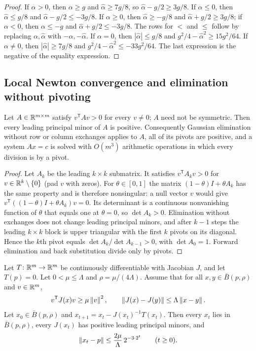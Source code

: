 \begin{proof}
If $\alpha>0$, then $\alpha\ge g$ and $\hat\alpha\ge7g/8$, so
$\hat\alpha-g/2\ge3g/8$. If $\alpha\le0$, then $\hat\alpha\le g/8$ and
$\hat\alpha-g/2\le-3g/8$. If $\alpha\ge0$, then $\hat\alpha\ge-g/8$ and
$\hat\alpha+g/2\ge3g/8$; if $\alpha<0$, then $\alpha\le-g$ and
$\hat\alpha+g/2\le-3g/8$. The rows for $<$ and $\le$ follow by replacing
$\alpha,\hat\alpha$ with $-\alpha,-\hat\alpha$. If $\alpha=0$, then
$|\hat\alpha|\le g/8$ and $g^2/4-\hat\alpha^2\ge15g^2/64$. If $\alpha\ne0$,
then $|\hat\alpha|\ge7g/8$ and $g^2/4-\hat\alpha^2\le-33g^2/64$. The last
expression is the negative of the equality expression.
\end{proof}

\subsection{Local Newton convergence and elimination without pivoting}
\label{app:upper-newton}

\begin{lemma}
\label{lem:upper-pivots}
Let $A\in\mathbb R^{m\times m}$ satisfy $v^{\mathsf T}Av>0$ for every $v\ne0$; $A$
need not be symmetric. Then every leading principal minor of $A$ is
positive. Consequently Gaussian elimination without row or column exchanges
applies to $A$, all of its pivots are positive, and a system $Ax=c$ is solved
with $O(m^3)$ arithmetic operations in which every division is by a pivot.
\end{lemma}

\begin{proof}
Let $A_k$ be the leading $k\times k$ submatrix. It satisfies
$v^{\mathsf T}A_kv>0$ for $v\in\mathbb R^k\setminus\{0\}$ (pad $v$ with zeros). For
$\theta\in[0,1]$ the matrix $(1-\theta)I+\theta A_k$ has the same property and
is therefore nonsingular: a null vector $v$ would give
$v^{\mathsf T}((1-\theta)I+\theta A_k)v=0$. Its determinant is a continuous
nonvanishing function of $\theta$ that equals one at $\theta=0$, so
$\det A_k>0$. Elimination without exchanges does not change leading principal
minors, and after $k-1$ steps the leading $k\times k$ block is upper triangular
with the first $k$ pivots on its diagonal. Hence the $k$th pivot equals
$\det A_k/\det A_{k-1}>0$, with $\det A_0=1$. Forward elimination and back
substitution divide only by pivots.
\end{proof}

\begin{lemma}
\label{lem:upper-local-newton}
Let $T\colon\mathbb R^m\to\mathbb R^m$ be continuously differentiable with Jacobian $J$,
and let $T(p)=0$. Let $0<\mu\le\Lambda$ and $\rho=\mu/(4\Lambda)$. Assume that
for all $x,y\in\bar B(p,\rho)$ and $v\in\mathbb R^m$,
\[
 v^{\mathsf T}J(x)v\ge\mu\left\lVert v\right\rVert^2,\qquad
 \left\lVert J(x)-J(y)\right\rVert\le\Lambda\left\lVert x-y\right\rVert.
\]
Let $x_0\in\bar B(p,\rho)$ and $x_{t+1}=x_t-J(x_t)^{-1}T(x_t)$. Then every
$x_t$ lies in $\bar B(p,\rho)$, every $J(x_t)$ has positive leading principal
minors, and
\[
 \left\lVert x_t-p\right\rVert\le\frac{2\mu}{\Lambda}\,2^{-3\cdot2^t}\qquad(t\ge0).
\]
\end{lemma}

